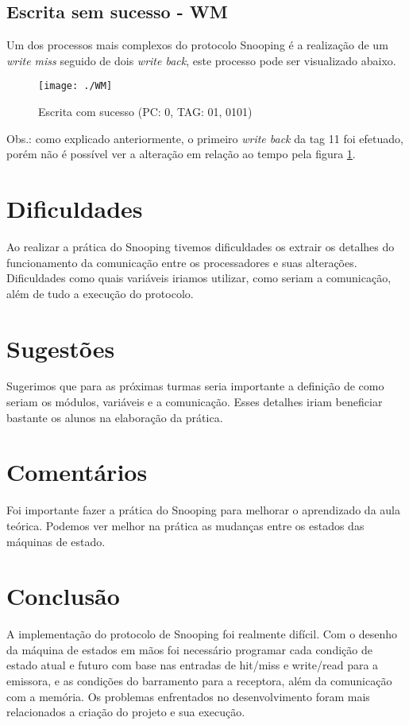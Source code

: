 \documentclass[12pt]{article}
\begin{document}
\subsection{Escrita sem sucesso - WM}

\par Um dos processos mais complexos do protocolo Snooping é a realização de um \textit{write miss} seguido de dois \textit{write back}, este processo pode ser visualizado abaixo.

\begin{figure}[H]
	\centering
	\texttt{[image: ./WM]}
	\caption{Escrita com sucesso (PC: 0, TAG: 01, 0101)}
	\label{fig: WM}
\end{figure}

\par Obs.: como explicado anteriormente, o primeiro \textit{write back} da tag 11 foi efetuado, porém não é possível ver a alteração em relação ao tempo pela figura \ref{fig: WM}.

\section{Dificuldades}

\par Ao realizar a prática do Snooping tivemos dificuldades os extrair os detalhes do funcionamento da comunicação entre os processadores e suas alterações. Dificuldades como quais variáveis iriamos utilizar, como seriam a comunicação, além de tudo a execução do protocolo.

\section{Sugestões}

\par Sugerimos que para as próximas turmas seria importante a definição de como seriam os módulos, variáveis e a comunicação. Esses detalhes iriam beneficiar bastante os alunos na elaboração da prática.

\section{Comentários}

\par Foi importante fazer a prática do Snooping para melhorar o aprendizado da aula teórica. Podemos ver melhor na prática as mudanças entre os estados das máquinas de estado.

\section{Conclusão}

\par A implementação do protocolo de Snooping foi realmente difícil. Com o desenho da máquina de estados em mãos foi necessário programar cada condição de estado atual e futuro com base nas entradas de hit/miss e write/read para a emissora, e as condições do barramento para a receptora, além da comunicação com a memória. Os problemas enfrentados no desenvolvimento foram mais relacionados a criação do projeto e sua execução. 
\end{document}
